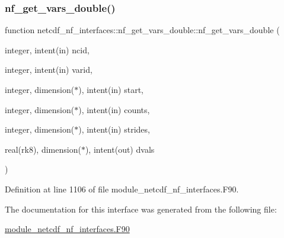\subsubsection{\texorpdfstring{nf\+\_\+get\+\_\+vars\+\_\+double()}{nf\_get\_vars\_double()}}
{\footnotesize\ttfamily function netcdf\+\_\+nf\+\_\+interfaces\+::nf\+\_\+get\+\_\+vars\+\_\+double\+::nf\+\_\+get\+\_\+vars\+\_\+double (\begin{DoxyParamCaption}\item[{integer, intent(in)}]{ncid,  }\item[{integer, intent(in)}]{varid,  }\item[{integer, dimension($\ast$), intent(in)}]{start,  }\item[{integer, dimension($\ast$), intent(in)}]{counts,  }\item[{integer, dimension($\ast$), intent(in)}]{strides,  }\item[{real(rk8), dimension($\ast$), intent(out)}]{dvals }\end{DoxyParamCaption})}



Definition at line 1106 of file module\+\_\+netcdf\+\_\+nf\+\_\+interfaces.\+F90.



The documentation for this interface was generated from the following file\+:\begin{DoxyCompactItemize}
\item 
\hyperlink{module__netcdf__nf__interfaces_8F90}{module\+\_\+netcdf\+\_\+nf\+\_\+interfaces.\+F90}\end{DoxyCompactItemize}
